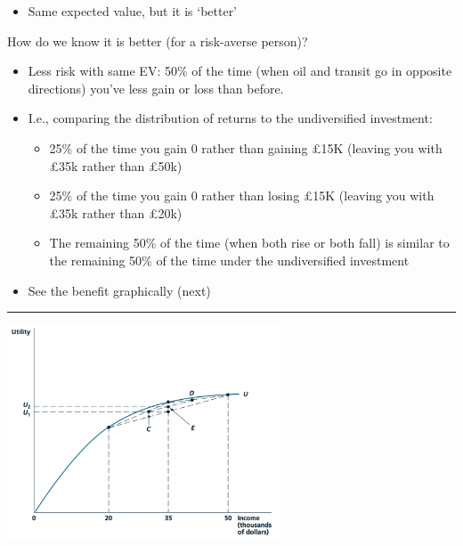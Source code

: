 \documentclass[]{article}
\providecommand{\tightlist}{%
  \setlength{\itemsep}{0pt}\setlength{\parskip}{0pt}}
\begin{document}
\begin{itemize}
\tightlist
\item
  Same expected value, but it is `better'
\end{itemize}

\bigskip

How do we know it is better (for a risk-averse person)?

\begin{itemize}
\item
  Less risk with same EV: 50\% of the time (when oil and transit go in opposite directions) you've less gain or loss than before.
\item
  I.e., comparing the distribution of returns to the undiversified investment:

  \begin{itemize}
  \tightlist
  \item
    25\% of the time you gain 0 rather than gaining \pounds 15K (leaving you with £35k rather than \pounds 50k)
  \item
    25\% of the time you gain 0 rather than losing \pounds 15K (leaving you with \pounds 35k rather than \pounds 20k)
  \item
    The remaining 50\% of the time (when both rise or both fall) is similar to the remaining 50\% of the time under the undiversified investment
  \end{itemize}
\end{itemize}

\begin{itemize}
\tightlist
\item
  See the benefit graphically (next)
\end{itemize}

\begin{center}\rule{0.5\linewidth}{\linethickness}\end{center}

\includegraphics[height=2.5in]{picsfigs/diverselessrisk.png}
\end{document}
